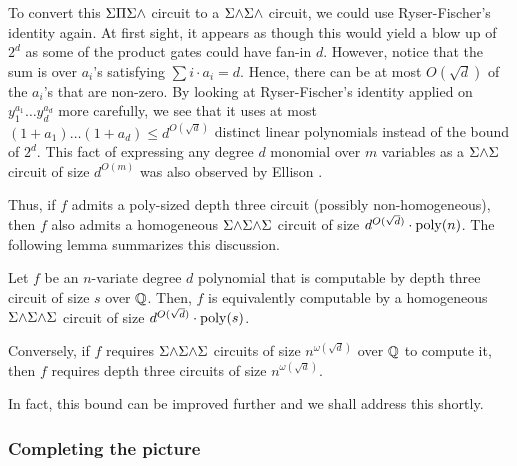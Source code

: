 To convert this $\Sigma\Pi\Sigma\mathord{\wedge}$ circuit to a
$\Sigma\mathord{\wedge}\Sigma\mathord{\wedge}$ circuit, we could use
Ryser-Fischer's identity again.
At first sight, it appears as though this would yield a blow up of
$2^d$ as some of the product gates could have fan-in $d$.
However, notice that the sum is over $a_i$'s satisfying $\sum i\cdot
a_i = d$.
Hence, there can be at most $O(\sqrt{d})$ of the $a_i$'s that are
non-zero.
By looking at Ryser-Fischer's identity applied on $y_1^{a_1}\dots
y_{d}^{a_d}$ more carefully, we see that it uses at most $(1+a_1)\dots
(1+a_d) \leq d^{O(\sqrt{d})}$ distinct linear polynomials instead of the
\naive bound of $2^{d}$.
This fact of expressing any degree $d$ monomial over $m$ variables as
a $\Sigma\mathord{\wedge}\Sigma$ circuit of size $d^{O(m)}$ was also observed
by Ellison \cite{ellison}. 

Thus, if $f$ admits a poly-sized depth three circuit (possibly non-homogeneous), then $f$ also
admits a homogeneous $\Sigma\mathord{\wedge}\Sigma\mathord{\wedge}\Sigma$ circuit of
size $d^{O(\sqrt{d})} \cdot \operatorname{poly}(n)$.
The following lemma summarizes this discussion. 

\begin{lemma}\label{lem:pow-depth3}
  Let $f$ be an $n$-variate degree $d$ polynomial that is computable
  by depth three circuit of size $s$ over $\mathbb{Q}$.
  Then, $f$ is equivalently computable by a homogeneous
  $\Sigma\mathord{\wedge}\Sigma\mathord{\wedge}\Sigma$ circuit of size
  $d^{O(\sqrt{d})}\cdot \operatorname{poly}(s)$. 

  Conversely, if $f$ requires $\Sigma\mathord{\wedge}\Sigma\mathord{\wedge}\Sigma$
  circuits of size $n^{\omega(\sqrt{d})}$ over $\mathbb{Q}$ to compute it,
  then $f$ requires depth three circuits of size
  $n^{\omega(\sqrt{d})}$. 
\end{lemma}

In fact, this bound can be improved further and we shall address this
shortly. 

\subsubsection{Completing the picture}

